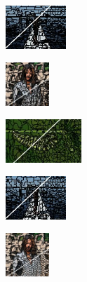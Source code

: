 \begin{figure}
\begin{subfigure}[b]{0.16\textwidth}
	\end{subfigure}
	\begin{subfigure}[b]{0.129\textwidth}
		\includegraphics[height=1.65cm]{pictures/sbd/etps/cropped/etps_0004774_contours}
	\end{subfigure}
	\begin{subfigure}[b]{0.10\textwidth}
		\includegraphics[height=1.65cm]{pictures/fash/etps/cropped/etps_010_contours}
	\end{subfigure}
	\begin{subfigure}[b]{0.02\textwidth}
	\end{subfigure}
	\begin{subfigure}[b]{0.16\textwidth}
		\includegraphics[height=1.65cm]{pictures/bsds500/lsc/cropped/lsc_35028_contours}
	\end{subfigure}
	\begin{subfigure}[b]{0.129\textwidth}
		\includegraphics[height=1.65cm]{pictures/sbd/lsc/cropped/lsc_0004774_contours}
	\end{subfigure}
	\begin{subfigure}[b]{0.10\textwidth}
		\includegraphics[height=1.65cm]{pictures/fash/lsc/cropped/lsc_010_contours}
	\end{subfigure}\\

\end{figure}
